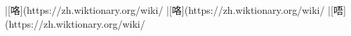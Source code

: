 |[咯](https://zh.wiktionary.org/wiki/%
|[咯](https://zh.wiktionary.org/wiki/%
|[唔](https://zh.wiktionary.org/wiki/%
